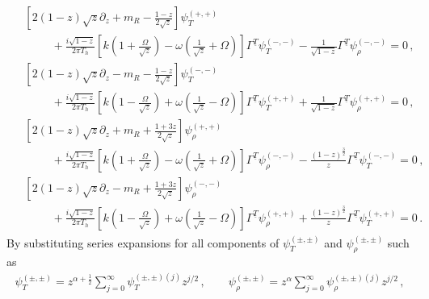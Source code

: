 \documentclass[11pt,a4paper]{article}
\begin{document}
\begin{align} \label{eq:Rarita eqn 3}
\begin{split}
    & \left[ 2(1-z)\sqrt{z} \partial_z + m_R - \frac{1-z}{2 \sqrt{z}} \right] \psi_T^{(+,+)}\\
    &  \hspace{1cm} + \frac{i\sqrt{1-z}}{2\pi T_h}\left[ k\left(1 +\frac{\Omega}{\sqrt{z}}\right) -\omega \left(\frac{1}{\sqrt{z}}+\Omega \right) \right] \Gamma^{\underline{T}} \psi_T^{(-,-)}
    - \frac{1}{\sqrt{1-z}}\Gamma^{\underline{T}} \psi_\rho^{(-,-)} =0\,,
    \\
    & \left[ 2(1-z)\sqrt{z} \partial_z - m_R - \frac{1-z}{2 \sqrt{z}} \right] \psi_T^{(-,-)}\\
    &  \hspace{1cm} + \frac{i\sqrt{1-z}}{2\pi T_h}\left[ k\left(1 - \frac{\Omega}{\sqrt{z}}\right) + \omega \left(\frac{1}{\sqrt{z}} - \Omega \right) \right] \Gamma^{\underline{T}} \psi_T^{(+,+)}
    + \frac{1}{\sqrt{1-z}}\Gamma^{\underline{T}} \psi_\rho^{(+,+)} =0\,,
    \\
    & \left[ 2(1-z)\sqrt{z} \partial_z + m_R + \frac{1 + 3z}{2 \sqrt{z}} \right] \psi_\rho^{(+,+)}\\
    &  \hspace{1cm} + \frac{i\sqrt{1-z}}{2\pi T_h}\left[ k\left(1 + \frac{\Omega}{\sqrt{z}}\right) - \omega \left(\frac{1}{\sqrt{z}} + \Omega \right) \right] \Gamma^{\underline{T}} \psi_\rho^{(-,-)}
    - \frac{(1-z)^{\frac{3}{2}}}{z}\Gamma^{\underline{T}} \psi_T^{(-,-)} =0\,,
    \\
    & \left[ 2(1-z)\sqrt{z} \partial_z - m_R + \frac{1 + 3z}{2 \sqrt{z}} \right] \psi_\rho^{(-,-)}\\
    &  \hspace{1cm} + \frac{i\sqrt{1-z}}{2\pi T_h}\left[ k\left(1 - \frac{\Omega}{\sqrt{z}}\right) + \omega \left(\frac{1}{\sqrt{z}} - \Omega \right) \right] \Gamma^{\underline{T}} \psi_\rho^{(+,+)}
    + \frac{(1-z)^{\frac{3}{2}}}{z}\Gamma^{\underline{T}} \psi_T^{(+,+)} =0\,.
\end{split}
\end{align}
By substituting series expansions for all components of $\psi_T^{(\pm,\pm)}$ and $\psi_\rho^{(\pm,\pm)}$ such as
\begin{align} \label{eq:Rarita series sol ansatz}
    \psi_T^{(\pm,\pm)} = z^{\alpha+\frac{1}{2}} \sum^{\infty}_{j=0} \psi _T^{(\pm,\pm)(j)} z^{j/2} \,, \qquad
    \psi_\rho^{(\pm,\pm)} = z^\alpha \sum^{\infty}_{j=0} \psi _\rho^{(\pm,\pm)(j)} z^{j/2} \,, 
\end{align}
\end{document}
